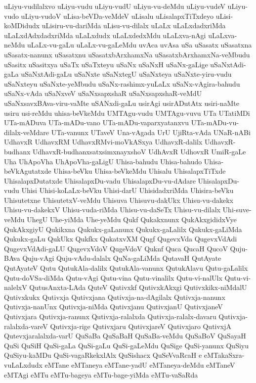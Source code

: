 {uLiyu-vudilalxvo
uLiyu-vudu
uLiyu-vudU
uLiyu-vu-deMdu
uLiyu-vudeV
uLiyu-vudo
uLiyu-vudoV
uLisa-beVDa-veMdeV
uLisalu
uLisalapxTiTxdeyo
uLisi-koMDidudx
uLisiru-vu-dariMda
uLisu-vu-dilalx
uLaLx
uLaLxdadxriMda
uLaLxdAdxdadxriMda
uLaLxdudx
uLaLxdedxMdu
uLaLxva-nAgi
uLaLxva-neMdu
uLaLx-vu-gaLu
uLaLx-vu-gaLeMdu
uvAca
uvAsa
uSa
uSasatx
uSasatxna
uSasatx-nanunx
uSasatxnu
uSasatxbArxhamxNa
uSasatxbArxhamxNa-veMbudu
uSasitx
uSasitxya
uSaTx
uSaTxteyu
uSaNx
uSaNxH
uSaNx-gaLige
uSaNxtAdi-gaLa
uSaNxtAdi-gaLu
uSaNxte
uSaNxtegU
uSaNxteya
uSaNxte-yiru-vudu
uSaNxteyu
uSaNxte-yeMbudu
uSaNx-rashimx-yuLaLx
uSaNx-vAgira-bahudu
uSaNx-vAda
uSaNxveV
uSaNxsapxshaR
uSaNxsapxshaR-veMdU
uSaNxsavxBAva-viru-vaMte
uSANxdi-gaLu
usirAgi
usirADutAtx
usiri-naMte
usiru
usi-reMdu
uhisa-beVkeMdu
UMTAgu-vudu
UMTAgu-vuvu
UTa
UTatiMDi
UTa-mADuva
UTa-mADu-vano
UTa-mADu-vaparxyatanxvu
UTa-mADu-vu-dilalx-veMdare
UTa-vanunx
UTaveV
Una-vAgada
UrU
UjiRta-vAda
UNaR-nABi
UdhavxR
UdhavxRM
UdhavxRMvi-moVkASxya
UdhavxR-dalilx
UdhavxR-budhanx
UdhavxR-budhanxsatxsimxnayxshoV
UdhAvxR
UdhovxR
UmiR-gaLe
Uha
UhApoVha
UhApoVha-gaLigU
Uhisa-bahudu
Uhisa-bahudo
Uhisa-beVkAgutatxde
Uhisa-beVku
Uhisa-beVkeMdu
Uhisalu
UhisalapxTiTxde
UhisalapxDutatxde
UhisalapxDu-vadu
UhisalapxDu-vu-dAdare
UhisalapxDu-vudu
Uhisi
Uhisi-koLaLx-beVku
Uhisi-darU
UhisidadxriMda
Uhisira-beVku
Uhisutetxne
UhisutetxV-veMdu
Uhisuva
Uhisuvu-dakUkx
Uhisu-vu-dakekx
Uhisu-vu-dakekxV
Uhisu-vuda-riMda
Uhisu-vu-daSeTx
Uhisu-vu-dilalx
Uhi-suve-veMdu
UhegU
Uhe-yiMda
Uhe-yeMdu
Qukf
Qukakxnunx
QukAkxgididxVye
QukAkxgiyU
Qukikxna
Qukukx-gaLanunx
Qukukx-gaLalilx
Qukukx-gaLiMda
Qukukx-gaLu
QukUkx
Qukfkx
QukatxvXM
Qugf
QugevxVda
QugevxVdAdi
QugevxVdAdi-gaLU
QugevxVdoV
QugeVdoV
Quknf
Quca
QucaH
QucoV
Quju-BAva
Quju-vAgi
Quju-vAdu-dalalx
QuNa-gaLiMda
QutavaH
QutAyate
QutAyateV
Qutu
QutukAla-dalilx
QutukAla-vanunx
QutukAlavu
Qutu-gaLalilx
Qutu-doVSa-diMda
Qutu-vAgi
Qutu-vina
Qutu-vinalilx
Qutu-vi-nalUlx
Qutu-vi-nalelxV
QutusAnxta-LAda
QuteV
Qutivxkf
QutivxkAkxgi
Qutivxkikx-niMdalU
Qutivxkukx
Qutivxja
Qutivxjana
Qutivxja-na-dAgilalx
Qutivxja-nanunx
Qutivxja-nanUnx
Qutivxja-niMda
Qutivxjanu
QutivxjanU
QutivxjaneV
Qutivxjara
Qutivxja-ranunx
Qutivxja-ralalxda
Qutivxja-ralalx-davaru
Qutivxja-ralalxda-vareV
Qutivxja-rige
Qutivxjaru
QutivxjareV
Qutivxjaro
QutivxjA
Qutevxjaralalxda-varU
QuSaBa
QuSaBaH
QuSaBa-veMdu
QuSaBoV
QuSayaH
QuSi
QuSiH
QuSi-gaLa
QuSi-gaLu
QuSi-gaLeMdu
QuSige
QuSi-yanunx
QuSiyu
QuSiyu-kaMDu
QuSi-vagaRkekxlAlx
QuSishacx
QuSeVvaRcaH
e
eMTakaSxra-vuLaLxdudx
eMTane
eMTaneya
eMTane-yadU
eMTaneya-deMdu
eMTaneV
eMTAgi
eMTu
eMTu-bageya
eMTu-bage-yiMda
eMTu-vaSaRda
}
